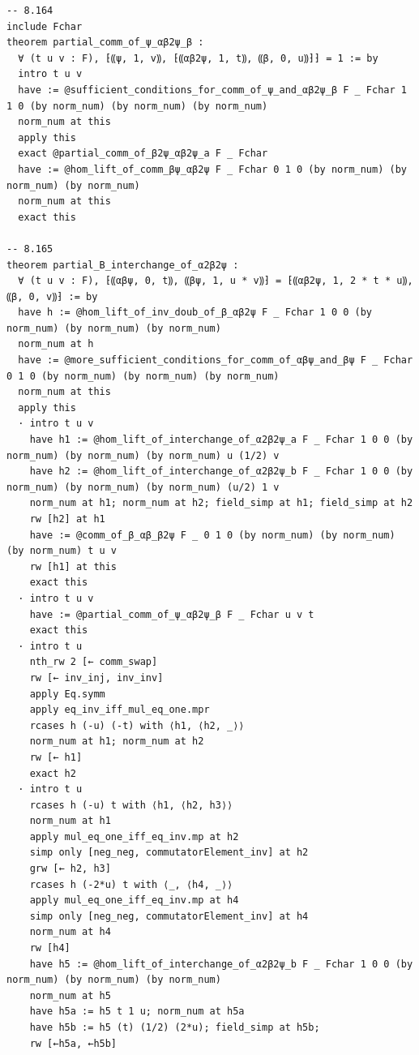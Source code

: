 \begin{Verbatim}
-- 8.164
include Fchar
theorem partial_comm_of_ψ_αβ2ψ_β :
  ∀ (t u v : F), ⁅⸨ψ, 1, v⸩, ⁅⸨αβ2ψ, 1, t⸩, ⸨β, 0, u⸩⁆⁆ = 1 := by
  intro t u v
  have := @sufficient_conditions_for_comm_of_ψ_and_αβ2ψ_β F _ Fchar 1 1 0 (by norm_num) (by norm_num) (by norm_num)
  norm_num at this
  apply this
  exact @partial_comm_of_β2ψ_αβ2ψ_a F _ Fchar
  have := @hom_lift_of_comm_βψ_αβ2ψ F _ Fchar 0 1 0 (by norm_num) (by norm_num) (by norm_num)
  norm_num at this
  exact this

-- 8.165
theorem partial_B_interchange_of_α2β2ψ :
  ∀ (t u v : F), ⁅⸨αβψ, 0, t⸩, ⸨βψ, 1, u * v⸩⁆ = ⁅⸨αβ2ψ, 1, 2 * t * u⸩, ⸨β, 0, v⸩⁆ := by
  have h := @hom_lift_of_inv_doub_of_β_αβ2ψ F _ Fchar 1 0 0 (by norm_num) (by norm_num) (by norm_num)
  norm_num at h
  have := @more_sufficient_conditions_for_comm_of_αβψ_and_βψ F _ Fchar 0 1 0 (by norm_num) (by norm_num) (by norm_num)
  norm_num at this
  apply this
  · intro t u v
    have h1 := @hom_lift_of_interchange_of_α2β2ψ_a F _ Fchar 1 0 0 (by norm_num) (by norm_num) (by norm_num) u (1/2) v
    have h2 := @hom_lift_of_interchange_of_α2β2ψ_b F _ Fchar 1 0 0 (by norm_num) (by norm_num) (by norm_num) (u/2) 1 v
    norm_num at h1; norm_num at h2; field_simp at h1; field_simp at h2
    rw [h2] at h1
    have := @comm_of_β_αβ_β2ψ F _ 0 1 0 (by norm_num) (by norm_num) (by norm_num) t u v
    rw [h1] at this
    exact this
  · intro t u v
    have := @partial_comm_of_ψ_αβ2ψ_β F _ Fchar u v t
    exact this
  · intro t u
    nth_rw 2 [← comm_swap]
    rw [← inv_inj, inv_inv]
    apply Eq.symm
    apply eq_inv_iff_mul_eq_one.mpr
    rcases h (-u) (-t) with ⟨h1, ⟨h2, _⟩⟩
    norm_num at h1; norm_num at h2
    rw [← h1]
    exact h2
  · intro t u
    rcases h (-u) t with ⟨h1, ⟨h2, h3⟩⟩
    norm_num at h1
    apply mul_eq_one_iff_eq_inv.mp at h2
    simp only [neg_neg, commutatorElement_inv] at h2
    grw [← h2, h3]
    rcases h (-2*u) t with ⟨_, ⟨h4, _⟩⟩
    apply mul_eq_one_iff_eq_inv.mp at h4
    simp only [neg_neg, commutatorElement_inv] at h4
    norm_num at h4
    rw [h4]
    have h5 := @hom_lift_of_interchange_of_α2β2ψ_b F _ Fchar 1 0 0 (by norm_num) (by norm_num) (by norm_num)
    norm_num at h5
    have h5a := h5 t 1 u; norm_num at h5a
    have h5b := h5 (t) (1/2) (2*u); field_simp at h5b;
    rw [←h5a, ←h5b]


\end{Verbatim}
